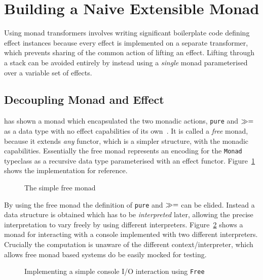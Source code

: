 \section{Building a Naive Extensible Monad}

\label{sec:free}

Using monad transformers involves writing significant boilerplate code defining
effect instances because every effect is implemented on a separate transformer,
which prevents sharing of the common action of lifting an effect. Lifting
through a stack can be avoided entirely by instead using a \emph{single} monad
parameterised over a variable set of effects.

\subsection{Decoupling Monad and Effect}

\label{sec:introducing-free}

\citeauthor{data-types-a-la-carte} has shown a monad which encapsulated the two
monadic actions, \texttt{pure} and $\gg=$ as a data type with no effect
capabilities of its own~\cite{data-types-a-la-carte}. It is called a \emph{free}
monad, because it extends \emph{any} functor, which is a simpler structure, with
the monadic capabilities. Essentially the free monad represents an encoding for
the \texttt{Monad} typeclass as a recursive data type parameterised with an
effect functor. Figure~\ref{fig:free-monad} shows the implementation for reference.

\begin{figure}
  
  \caption{The simple free monad}
  \label{fig:free-monad}
\end{figure}

By using the free monad the definition of \texttt{pure} and $\gg=$ can be
elided. Instead a data structure is obtained which has to be
\emph{interpreted} later, allowing the precise interpretation to vary freely
by using different interpreters. Figure~\ref{fig:console-io-example} shows a
monad for interacting with a console implemented with two different
interpreters. Crucially the computation is unaware of the different
context/interpreter, which allows free monad based systems do be easily mocked
for testing.

\begin{figure}
  
   \caption{Implementing a simple console I/O interaction using
    \texttt{Free}}
  \label{fig:console-io-example}
\end{figure}


